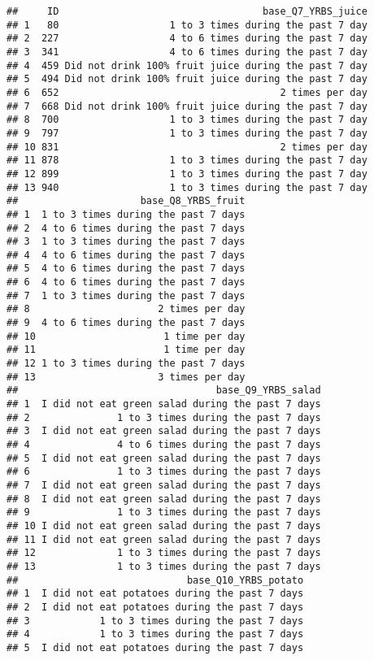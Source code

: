 \documentclass[]{article}
\begin{document}
\begin{verbatim}
##     ID                                   base_Q7_YRBS_juice
## 1   80                   1 to 3 times during the past 7 day
## 2  227                   4 to 6 times during the past 7 day
## 3  341                   4 to 6 times during the past 7 day
## 4  459 Did not drink 100% fruit juice during the past 7 day
## 5  494 Did not drink 100% fruit juice during the past 7 day
## 6  652                                      2 times per day
## 7  668 Did not drink 100% fruit juice during the past 7 day
## 8  700                   1 to 3 times during the past 7 day
## 9  797                   1 to 3 times during the past 7 day
## 10 831                                      2 times per day
## 11 878                   1 to 3 times during the past 7 day
## 12 899                   1 to 3 times during the past 7 day
## 13 940                   1 to 3 times during the past 7 day
##                     base_Q8_YRBS_fruit
## 1  1 to 3 times during the past 7 days
## 2  4 to 6 times during the past 7 days
## 3  1 to 3 times during the past 7 days
## 4  4 to 6 times during the past 7 days
## 5  4 to 6 times during the past 7 days
## 6  4 to 6 times during the past 7 days
## 7  1 to 3 times during the past 7 days
## 8                      2 times per day
## 9  4 to 6 times during the past 7 days
## 10                      1 time per day
## 11                      1 time per day
## 12 1 to 3 times during the past 7 days
## 13                     3 times per day
##                                  base_Q9_YRBS_salad
## 1  I did not eat green salad during the past 7 days
## 2               1 to 3 times during the past 7 days
## 3  I did not eat green salad during the past 7 days
## 4               4 to 6 times during the past 7 days
## 5  I did not eat green salad during the past 7 days
## 6               1 to 3 times during the past 7 days
## 7  I did not eat green salad during the past 7 days
## 8  I did not eat green salad during the past 7 days
## 9               1 to 3 times during the past 7 days
## 10 I did not eat green salad during the past 7 days
## 11 I did not eat green salad during the past 7 days
## 12              1 to 3 times during the past 7 days
## 13              1 to 3 times during the past 7 days
##                             base_Q10_YRBS_potato
## 1  I did not eat potatoes during the past 7 days
## 2  I did not eat potatoes during the past 7 days
## 3            1 to 3 times during the past 7 days
## 4            1 to 3 times during the past 7 days
## 5  I did not eat potatoes during the past 7 days

\end{verbatim}
\end{document}
